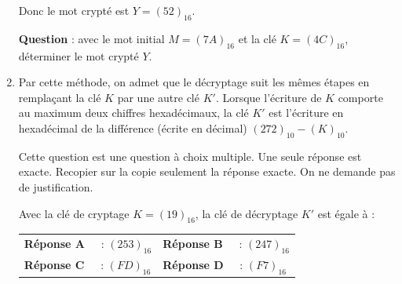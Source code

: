 \begin{exercice}
\begin{enumerate}
              Donc le mot crypté est $Y = (52)_{16}$.
              
              \smallskip
              
              \textbf{Question }: avec le mot initial $M = (7 A)_{16}$ et la clé $K = (4C)_{16}$, déterminer le mot crypté $Y$.
        \item Par cette méthode, on admet que le décryptage suit les mêmes étapes en remplaçant la clé $K$ par une autre clé $K'$. Lorsque l'écriture de $K$ comporte au maximum deux chiffres hexadécimaux,
              la clé $K'$ est l'écriture en hexadécimal de la différence (écrite en décimal) $(272)_{10} - (K)_{10}$.
              
              \smallskip
              
              Cette question est une question à choix multiple. Une seule réponse est exacte. Recopier sur la
              copie seulement la réponse exacte. On ne demande pas de justification.
              
              \smallskip
              
              Avec la clé de cryptage $K = (19)_{16}$, la clé de décryptage $K'$ est égale à :
              
              \begin{center}
                  \begin{tabularx}{0.75\linewidth}{X X}
                      \textbf{Réponse A~~} : $(253)_{16}$ & \textbf{Réponse B~~} : $(247)_{16}$ \\
                      \textbf{Réponse C~~} : $(FD)_{16}$  & \textbf{Réponse D~~} : $(F7)_{16}$  \\
                  \end{tabularx}
              \end{center}
    \end{enumerate}
\end{exercice}

